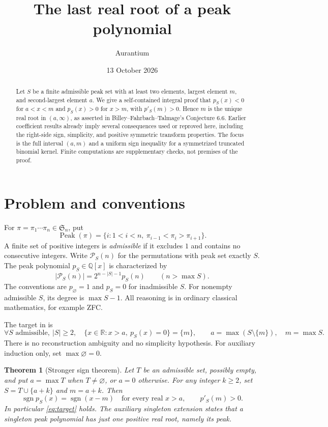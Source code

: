\documentclass[11pt]{article}
\title{The last real root of a peak polynomial}
\author{Aurantium}
\date{13 October 2026}
\newtheorem{theorem}{Theorem}
\theoremstyle{definition}
\newcommand{\Pk}{\mathcal P}
\newcommand{\sgn}{\operatorname{sgn}}
\newcommand{\R}{\mathbb R}
\newcommand{\Q}{\mathbb Q}
\begin{document}
\maketitle
\begin{abstract}
Let $S$ be a finite admissible peak set with at least two elements, largest element $m$, and second-largest element $a$. We give a self-contained integral proof that $p_S(x)<0$ for $a<x<m$ and $p_S(x)>0$ for $x>m$, with $p'_S(m)>0$. Hence $m$ is the unique real root in $(a,\infty)$, as asserted in Billey--Fahrbach--Talmage's Conjecture 6.6. Earlier coefficient results already imply several consequences used or reproved here, including the right-side sign, simplicity, and positive symmetric transform properties. The focus is the full interval $(a,m)$ and a uniform sign inequality for a symmetrized truncated binomial kernel. Finite computations are supplementary checks, not premises of the proof.
\end{abstract}

\section{Problem and conventions}
For $\pi=\pi_1\cdots\pi_n\in\mathfrak S_n$, put
\[
 \operatorname{Peak}(\pi)=\{i:1<i<n,\ \pi_{i-1}<\pi_i>\pi_{i+1}\}.
\]
A finite set of positive integers is \emph{admissible} if it excludes $1$ and contains no consecutive integers. Write $\Pk_S(n)$ for the permutations with peak set exactly $S$. The peak polynomial $p_S\in\Q[x]$ is characterized by
\[
 |\Pk_S(n)|=2^{n-|S|-1}p_S(n)\qquad(n>\max S).
\]
The conventions are $p_\varnothing=1$ and $p_S=0$ for inadmissible $S$. For nonempty admissible $S$, its degree is $\max S-1$. All reasoning is in ordinary classical mathematics, for example ZFC.

The target in \cite[Conjecture 6.6, PDF p.~19]{BFT} is
\begin{equation}\label{eq:target}
 \forall S\text{ admissible},\ |S|\ge2,\quad
 \{x\in\R:x>a,\ p_S(x)=0\}=\{m\},
 \qquad a=\max(S\setminus\{m\}),\quad m=\max S.
\end{equation}
There is no reconstruction ambiguity and no simplicity hypothesis. For auxiliary induction only, set $\max\varnothing=0$.

\begin{theorem}[Stronger sign theorem]\label{thm:main}
Let $T$ be an admissible set, possibly empty, and put $a=\max T$ when $T\ne\varnothing$, or $a=0$ otherwise. For any integer $k\ge2$, set $S=T\cup\{a+k\}$ and $m=a+k$. Then
\[
 \sgn p_S(x)=\sgn(x-m)\quad\text{for every real }x>a,
 \qquad p'_S(m)>0.
\]
In particular \eqref{eq:target} holds. The auxiliary singleton extension states that a singleton peak polynomial has just one positive real root, namely its peak.
\end{theorem}
\end{document}
